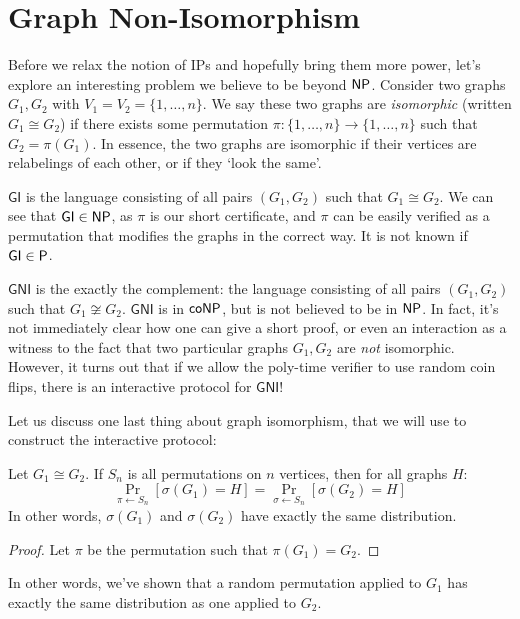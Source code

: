 \documentclass{article}
\begin{document}
\section{Graph Non-Isomorphism}

Before we relax the notion of IPs and hopefully bring them more power, let's explore an interesting problem we believe to be beyond $\mathsf{NP}$.
Consider two graphs $G_1, G_2$ with $V_1 = V_2 = \{1, \ldots, n \}$.
We say these two graphs are \textit{isomorphic} (written $G_1 \cong G_2$) if there exists some permutation $\pi \colon \{1, \ldots, n \} \to \{1, \ldots, n\}$ such that $G_2 = \pi(G_1)$. 
In essence, the two graphs are isomorphic if their vertices are relabelings of each other, or if they `look the same'.

$\textsf{GI}$ is the language consisting of all pairs $(G_1, G_2)$ such that 
$G_1 \cong G_2$. We can see that $\textsf{GI} \in \mathsf{NP}$, as $\pi$ is our short certificate, and $\pi$ can be easily verified as a permutation that modifies the graphs in the correct way. It is not known if $\textsf{GI} \in \mathsf{P}$.

$\textsf{GNI}$ is the exactly the complement: the language consisting of all pairs $(G_1, G_2)$ such that $G_1 \not\cong G_2$. 
$\textsf{GNI}$ is in $\mathsf{coNP}$, but is not believed to be in $\mathsf{NP}$. 
In fact, it's not immediately clear how one can give a short proof, or even an interaction as a witness to the fact that two particular graphs $G_1, G_2$ are \textit{not} isomorphic. 
However, it turns out that if we allow the poly-time verifier to use random coin flips, there is an interactive protocol for $\textsf{GNI}$!

Let us discuss one last thing about graph isomorphism, that we will use to construct the interactive protocol:

\begin{claim}
    Let $G_1 \cong G_2$. If $S_n$ is all permutations on $n$ vertices, then for all graphs $H$:
    $$\Pr_{\pi \leftarrow S_n}[\sigma(G_1) = H] = \Pr_{\sigma \leftarrow S_n}[\sigma(G_2) = H]$$
    In other words, $\sigma(G_1)$ and $\sigma(G_2)$ have exactly the same distribution.
\end{claim}
\begin{proof}
    Let $\pi$ be the permutation such that $\pi(G_1) = G_2$.


\end{proof}

In other words, we've shown that a random permutation applied to $G_1$ has exactly the same distribution as one applied to $G_2$.
\end{document}
